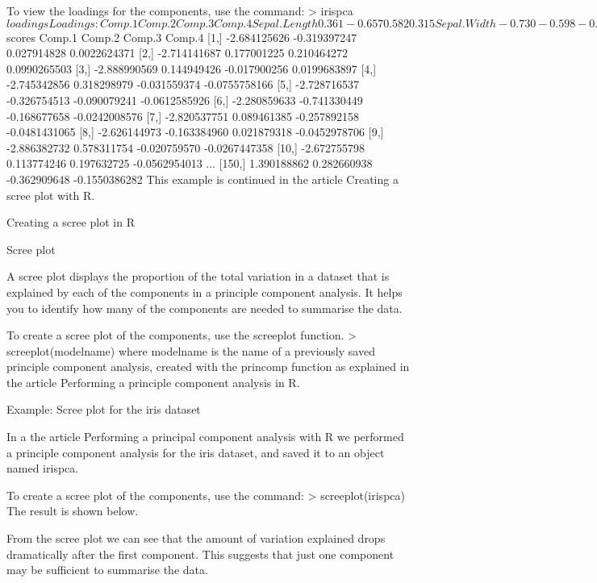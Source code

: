 To view the loadings for the components, use the command:
 > irispca$loadings Loadings:
             Comp.1 Comp.2 Comp.3 Comp.4
Sepal.Length  0.361 -0.657  0.582  0.315
Sepal.Width         -0.730 -0.598 -0.320
Petal.Length  0.857  0.173        -0.480
Petal.Width   0.358        -0.546  0.754

               Comp.1 Comp.2 Comp.3 Comp.4
SS loadings      1.00   1.00   1.00   1.00
Proportion Var   0.25   0.25   0.25   0.25
Cumulative Var   0.25   0.50   0.75   1.00 
To view the scores for each observation, use the command:
 > irispca$scores              Comp.1       Comp.2       Comp.3        Comp.4
  [1,] -2.684125626 -0.319397247  0.027914828  0.0022624371
  [2,] -2.714141687  0.177001225  0.210464272  0.0990265503
  [3,] -2.888990569  0.144949426 -0.017900256  0.0199683897
  [4,] -2.745342856  0.318298979 -0.031559374 -0.0755758166
  [5,] -2.728716537 -0.326754513 -0.090079241 -0.0612585926
  [6,] -2.280859633 -0.741330449 -0.168677658 -0.0242008576
  [7,] -2.820537751  0.089461385 -0.257892158 -0.0481431065
  [8,] -2.626144973 -0.163384960  0.021879318 -0.0452978706
  [9,] -2.886382732  0.578311754 -0.020759570 -0.0267447358
 [10,] -2.672755798  0.113774246  0.197632725 -0.0562954013
...
[150,]  1.390188862  0.282660938 -0.362909648 -0.1550386282 
This example is continued in the article Creating a scree plot with R.




Creating a scree plot in R 






Scree plot
 
A scree plot displays the proportion of the total variation in a dataset that is explained by each of the components in a principle component analysis. It helps you to identify how many of the components are needed to summarise the data.
 
To create a scree plot of the components, use the screeplot function.
 > screeplot(modelname) 
where modelname is the name of a previously saved principle component analysis, created with the princomp function as explained in the article Performing a principle component analysis in R.
 
Example: Scree plot for the iris dataset
 
In a the article Performing a principal component analysis with R we performed a principle component analysis for the iris dataset, and saved it to an object named irispca.
 
To create a scree plot of the components, use the command:
 > screeplot(irispca) 
The result is shown below.
 


From the scree plot we can see that the amount of variation explained drops dramatically after the first component. This suggests that just one component may be sufficient to summarise the data.
